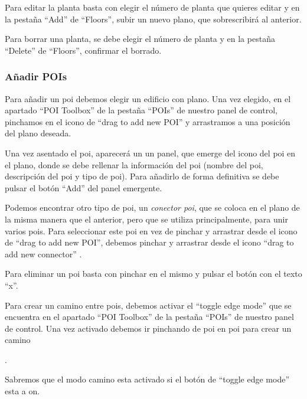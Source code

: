 Para editar la planta basta con elegir el número de planta que quieres editar y en la pestaña ``Add'' de ``Floors'', subir un nuevo plano, que sobrescribirá al anterior.

Para borrar una planta, se debe elegir el número de planta y en la pestaña ``Delete'' de ``Floors'', confirmar el borrado.

\subsubsection{Añadir POIs}

Para añadir un poi debemos elegir un edificio con plano. Una vez elegido, en el apartado ``POI Toolbox'' de la pestaña ``POIs'' de nuestro panel de control, pinchamos en el icono de ``drag to add new POI'' y arrastramos a una posición del plano deseada.


Una vez asentado el poi, aparecerá un un panel, que emerge del icono del poi en el plano, donde se debe rellenar la información del poi (nombre del poi, descripción del poi y tipo de poi). Para añadirlo de forma definitiva se debe pulsar el botón ``Add'' del panel emergente.
\newpage
{}

Podemos encontrar otro tipo de poi, un \textit{conector poi}, que se coloca en el plano de la misma manera que el anterior, pero que se utiliza principalmente, para unir varios pois. Para seleccionar este poi en vez de pinchar y arrastrar desde el icono de ``drag to add new POI'', debemos pinchar y arrastrar desde el icono ``drag to add new connector'' .


Para eliminar un poi basta con pinchar en el mismo y pulsar el botón con el texto ``x''.

Para crear un camino entre pois, debemos activar el ``toggle edge mode'' que se encuentra en el apartado ``POI Toolbox'' de la pestaña ``POIs'' de nuestro panel de control. Una vez activado debemos ir pinchando de poi en poi para crear un camino

.

Sabremos que el modo camino esta activado si el botón de ``toggle edge mode'' esta a on.  

